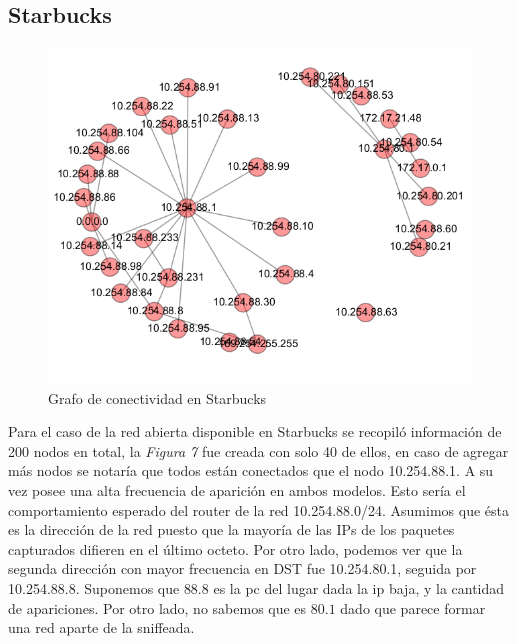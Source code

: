 \subsection{Starbucks}

\begin{figure}[h!]
	\begin{center}
		  \includegraphics[scale=.6]{resultados/starbucks/conectividadNX.png}
		  \caption{Grafo de conectividad en Starbucks}
		  \label{fig:contra1}
	\end{center}
\end{figure}


Para el caso de la red abierta disponible en Starbucks se recopil\'o
informaci\'on de 200 nodos en total, la \emph{Figura 7} fue 
creada con solo 40 de ellos, en caso de agregar m\'as nodos se notar\'ia
que todos est\'an conectados que el nodo 10.254.88.1. 
A su vez posee una alta frecuencia de aparici\'on en ambos
modelos. Esto ser\'ia el comportamiento esperado del router de la red
10.254.88.0/24. Asumimos que \'esta es la direcci\'on de la red puesto que 
la mayor\'ia de las IPs de los paquetes capturados difieren en el \'ultimo octeto.
Por otro lado, podemos ver que la segunda direcci\'on con mayor frecuencia en DST
fue 10.254.80.1, seguida por 10.254.88.8. Suponemos que $88.8$ es la pc del lugar
dada la ip baja, y la cantidad de apariciones. Por otro lado, no sabemos que es
$80.1$ dado que parece formar una red aparte de la sniffeada.

